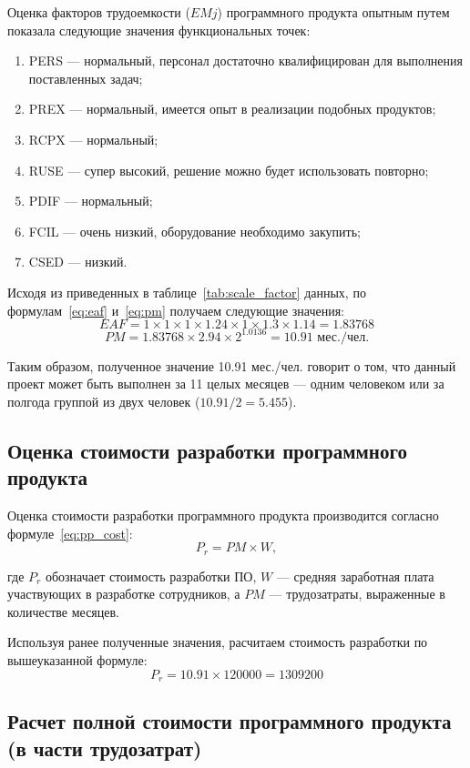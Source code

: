 Оценка факторов трудоемкости ($EMj$) программного продукта опытным путем показала следующие значения функциональных точек:

\begin{enumerate}
    \item PERS --- нормальный, персонал достаточно квалифицирован для выполнения поставленных задач;
    \item PREX --- нормальный, имеется опыт в реализации подобных продуктов;
    \item RCPX --- нормальный;
    \item RUSE --- супер высокий, решение можно будет использовать повторно;
    \item PDIF --- нормальный;
    \item FCIL --- очень низкий, оборудование необходимо закупить;
    \item CSED --- низкий.
\end{enumerate}

Исходя из приведенных в таблице~\ref{tab:scale_factor} данных, по формулам~\ref{eq:eaf} и~\ref{eq:pm} получаем следующие значения:
$$EAF = 1 \times 1 \times 1 \times 1.24 \times 1 \times 1.3 \times 1.14 = 1.83768$$
$$PM = 1.83768 \times 2.94  \times 2^{1.0136} = 10.91 \text{ мес./чел.}$$

Таким образом, полученное значение 10.91 мес./чел. говорит о том, что данный проект может быть выполнен за 11 целых месяцев --- одним человеком или за полгода группой из двух человек ($10.91/2=5.455$).

\subsection{Оценка стоимости разработки программного продукта}

Оценка стоимости разработки программного продукта производится согласно формуле~\ref{eq:pp_cost}:
\begin{equation}
    P_r = PM \times W,
    \label{eq:pp_cost}
\end{equation}

где $P_r$ обозначает стоимость разработки ПО, $W$ --- средняя заработная плата участвующих в разработке сотрудников, а $PM$ --- трудозатраты, выраженные в количестве месяцев.

Используя ранее полученные значения, расчитаем стоимость разработки по вышеуказанной формуле:
$$P_r = 10.91 \times 120000 = 1309200$$

\subsection{Расчет полной стоимости программного продукта (в части трудозатрат)}

